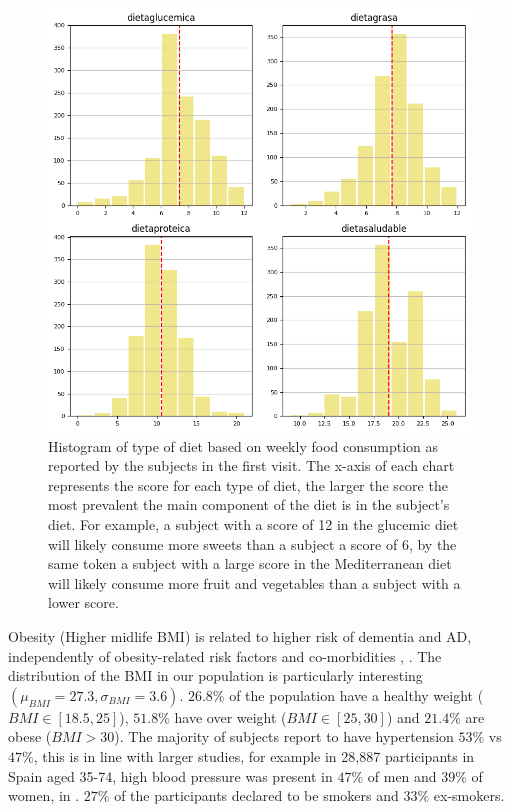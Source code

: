 \documentclass[11pt]{article}
\theoremstyle{definition}
\theoremstyle{remark}
\begin{document}
\begin{figure}[H]
        \centering
        \includegraphics[keepaspectratio, width=.8\linewidth]{figures/Fig_diet}
        \caption{Histogram of type of diet based on weekly food consumption as reported by the subjects in the first visit. The x-axis of each chart represents the score for each type of diet, the larger the score the most prevalent the main component of the diet is in the subject's diet. For example, a subject with a score of 12 in the glucemic diet will likely consume more sweets than a subject a score of 6, by the same token a subject with a large score in the Mediterranean diet will likely consume more fruit and vegetables than a subject with a lower score.} 
        \label{fig:diet}
\end{figure}

Obesity (Higher midlife BMI) is related to higher risk of dementia and AD, independently of obesity-related risk factors and co-morbidities \cite{tolppanen2014midlife}, \cite{nepal2014rising}. 
The distribution of the BMI in our population is particularly interesting $(\mu_{BMI}=27.3, \sigma_{BMI}=3.6)$. $26.8\%$ of the population have a healthy weight ($BMI \in [18.5, 25]$), $51.8\%$ have over weight ($BMI \in [25,30]$) and $21.4\%$ are obese ($BMI > 30$). 
The majority of subjects report to have hypertension $53\%$ vs $47\%$, this is in line with larger studies, for example in \cite{grau2011cardiovascular} 28,887 participants in Spain aged 35-74, high blood pressure was present in $47\%$ of men and $39\%$ of women, in \cite{lacruz2015prevalence}.
$27\%$ of the participants declared to be smokers and $33\%$ ex-smokers.
\end{document}
